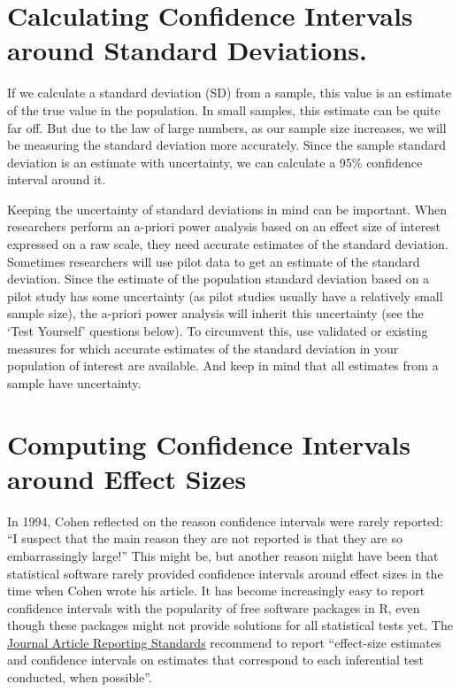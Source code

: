 \documentclass[
  oneside]{krantz}
\begin{document}
\hypertarget{calculating-confidence-intervals-around-standard-deviations.}{%
\section{Calculating Confidence Intervals around Standard Deviations.}\label{calculating-confidence-intervals-around-standard-deviations.}}

If we calculate a standard deviation (SD) from a sample, this value is an
estimate of the true value in the population. In small samples, this estimate can be quite far off. But due to the law of large numbers, as our sample size increases, we will be measuring the standard deviation more accurately. Since the sample standard deviation is an estimate with uncertainty, we can calculate a 95\% confidence interval around it.

Keeping the uncertainty of standard deviations in mind can be important. When researchers perform an a-priori power analysis based on an effect size of interest expressed on a raw scale, they need accurate estimates of the standard deviation. Sometimes researchers will use pilot data to get an estimate of the standard deviation. Since the estimate of the population standard deviation based on a pilot study has some uncertainty (as pilot studies usually have a relatively small sample size), the a-priori power analysis will inherit this uncertainty (see the `Test Yourself' questions below). To circumvent this, use validated or existing measures for which accurate estimates of the standard deviation in your population of interest are available. And keep in mind that all estimates from a sample have uncertainty.

\hypertarget{computing-confidence-intervals-around-effect-sizes}{%
\section{Computing Confidence Intervals around Effect Sizes}\label{computing-confidence-intervals-around-effect-sizes}}

In 1994, Cohen \citeyearpar{cohen_earth_1994} reflected on the reason confidence intervals were rarely reported: ``I suspect that the main reason they are not reported is that they are so embarrassingly large!'' This might be, but another reason might have been that statistical software rarely provided confidence intervals around effect sizes in the time when Cohen wrote his article. It has become increasingly easy to report confidence intervals with the popularity of free software packages in R, even though these packages might not provide solutions for all statistical tests yet. The \href{https://apastyle.apa.org/jars/quantitative}{Journal Article Reporting Standards} recommend to report ``effect-size estimates and confidence intervals on estimates that correspond to each inferential test conducted, when possible''.
\end{document}
